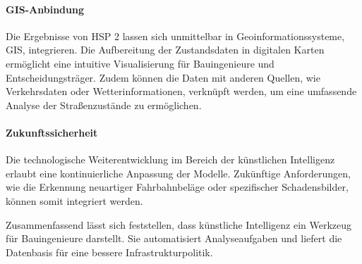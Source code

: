 \paragraph{GIS-Anbindung}
Die Ergebnisse von HSP 2 lassen sich unmittelbar in Geoinformationssysteme, GIS, integrieren. Die Aufbereitung der Zustandsdaten in digitalen Karten ermöglicht eine intuitive Visualisierung für Bauingenieure und Entscheidungsträger. Zudem können die Daten mit anderen Quellen, wie Verkehrsdaten oder Wetterinformationen, verknüpft werden, um eine umfassende Analyse der Straßenzustände zu ermöglichen.

\paragraph{Zukunftssicherheit}
Die technologische Weiterentwicklung im Bereich der künstlichen Intelligenz erlaubt eine kontinuierliche Anpassung der Modelle. Zukünftige Anforderungen, wie die Erkennung neuartiger Fahrbahnbeläge oder spezifischer Schadensbilder, können somit integriert werden.

Zusammenfassend lässt sich feststellen, dass künstliche Intelligenz ein Werkzeug für Bauingenieure darstellt. Sie automatisiert Analyseaufgaben und liefert die Datenbasis für eine bessere Infrastrukturpolitik.
